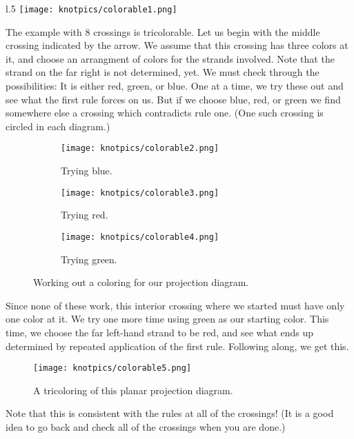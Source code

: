 \documentclass[12pt,letterpaper]{article}
\theoremstyle{definition}
\begin{document}
\begin{wrapfigure}{l}{.5\textwidth}
    \centering
    \texttt{[image: knotpics/colorable1.png]}
\end{wrapfigure}
The example with 8 crossings is tricolorable.
Let us begin with the middle crossing indicated by the arrow.
We assume that this crossing has three colors at it, and choose an arrangment of colors for the strands involved.
Note that the strand on the far right is not determined, yet.
We must check through the possibilities: It is either red, green, or blue. 
One at a time, we try these out and see what the first rule forces on us.
But if we choose blue, red, or green we find somewhere else a crossing which contradicts rule one.
(One such crossing is circled in each diagram.)
\begin{figure}
    \centering
    \begin{subfigure}{.3\textwidth}
        \centering
        \texttt{[image: knotpics/colorable2.png]}
        \caption{Trying blue.}
    \end{subfigure}
    \quad
    \begin{subfigure}{.3\textwidth}
        \centering
        \texttt{[image: knotpics/colorable3.png]}
        \caption{Trying red.}
    \end{subfigure}
    \quad
    \begin{subfigure}{.3\textwidth}
        \centering
        \texttt{[image: knotpics/colorable4.png]}
        \caption{Trying green.}
    \end{subfigure}
    \caption{Working out a coloring for our projection diagram.}
\end{figure}

Since none of these work, this interior crossing where we started must have only one color at it.
We try one more time using green as our starting color.
This time, we choose the far left-hand strand to be red, and see what ends up determined by repeated application of the first rule. 
Following along, we get this.
\begin{figure}[h]
    \centering
    \texttt{[image: knotpics/colorable5.png]}
    \caption{A tricoloring of this planar projection diagram.}
\end{figure}

Note that this is consistent with the rules at all of the crossings!
(It is a good idea to go back and check all of the crossings when you are done.)
\end{document}
